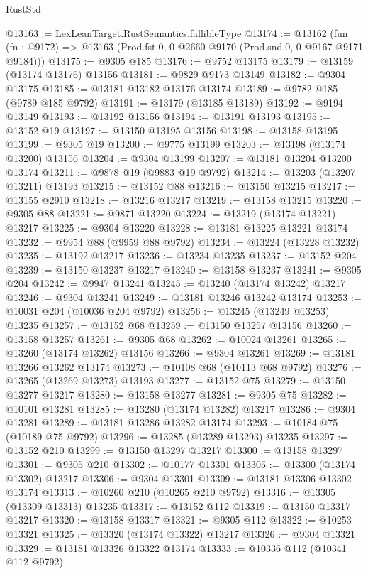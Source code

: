 \begin{lexlean}{RustStd}
\begin{coremodule}
@13163 := LexLeanTarget.RustSemantics.fallibleType
@13174 := @13162
    (fun (fn : @9172) => @13163 (Prod.fst.{0, 0} @2660 @9170 (Prod.snd.{0, 0} @9167 @9171 @9184)))
@13175 := @9305 @185
@13176 := @9752 @13175
@13179 := @13159 (@13174 @13176) @13156
@13181 := @9829 @9173 @13149
@13182 := @9304 @13175
@13185 := @13181 @13182 @13176 @13174
@13189 := @9782 @185 (@9789 @185 @9792)
@13191 := @13179 (@13185 @13189)
@13192 := @9194 @13149
@13193 := @13192 @13156
@13194 := @13191 @13193
@13195 := @13152 @19
@13197 := @13150 @13195 @13156
@13198 := @13158 @13195
@13199 := @9305 @19
@13200 := @9775 @13199
@13203 := @13198 (@13174 @13200) @13156
@13204 := @9304 @13199
@13207 := @13181 @13204 @13200 @13174
@13211 := @9878 @19 (@9883 @19 @9792)
@13214 := @13203 (@13207 @13211) @13193
@13215 := @13152 @88
@13216 := @13150 @13215
@13217 := @13155 @2910
@13218 := @13216 @13217
@13219 := @13158 @13215
@13220 := @9305 @88
@13221 := @9871 @13220
@13224 := @13219 (@13174 @13221) @13217
@13225 := @9304 @13220
@13228 := @13181 @13225 @13221 @13174
@13232 := @9954 @88 (@9959 @88 @9792)
@13234 := @13224 (@13228 @13232)
@13235 := @13192 @13217
@13236 := @13234 @13235
@13237 := @13152 @204
@13239 := @13150 @13237 @13217
@13240 := @13158 @13237
@13241 := @9305 @204
@13242 := @9947 @13241
@13245 := @13240 (@13174 @13242) @13217
@13246 := @9304 @13241
@13249 := @13181 @13246 @13242 @13174
@13253 := @10031 @204 (@10036 @204 @9792)
@13256 := @13245 (@13249 @13253) @13235
@13257 := @13152 @68
@13259 := @13150 @13257 @13156
@13260 := @13158 @13257
@13261 := @9305 @68
@13262 := @10024 @13261
@13265 := @13260 (@13174 @13262) @13156
@13266 := @9304 @13261
@13269 := @13181 @13266 @13262 @13174
@13273 := @10108 @68 (@10113 @68 @9792)
@13276 := @13265 (@13269 @13273) @13193
@13277 := @13152 @75
@13279 := @13150 @13277 @13217
@13280 := @13158 @13277
@13281 := @9305 @75
@13282 := @10101 @13281
@13285 := @13280 (@13174 @13282) @13217
@13286 := @9304 @13281
@13289 := @13181 @13286 @13282 @13174
@13293 := @10184 @75 (@10189 @75 @9792)
@13296 := @13285 (@13289 @13293) @13235
@13297 := @13152 @210
@13299 := @13150 @13297 @13217
@13300 := @13158 @13297
@13301 := @9305 @210
@13302 := @10177 @13301
@13305 := @13300 (@13174 @13302) @13217
@13306 := @9304 @13301
@13309 := @13181 @13306 @13302 @13174
@13313 := @10260 @210 (@10265 @210 @9792)
@13316 := @13305 (@13309 @13313) @13235
@13317 := @13152 @112
@13319 := @13150 @13317 @13217
@13320 := @13158 @13317
@13321 := @9305 @112
@13322 := @10253 @13321
@13325 := @13320 (@13174 @13322) @13217
@13326 := @9304 @13321
@13329 := @13181 @13326 @13322 @13174
@13333 := @10336 @112 (@10341 @112 @9792)

\end{coremodule}
\end{lexlean}
